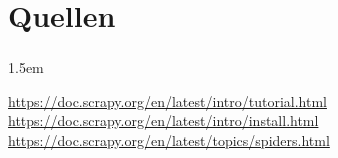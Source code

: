 \documentclass{beamer}
\begin{document}
\section{Quellen}
\begin{frame}
	\frametitle{\insertsection{}}
	\emergencystretch 1.5em
	{\small
	\begin{thebibliography}{8}
		\url{https://doc.scrapy.org/en/latest/intro/tutorial.html}
		\url{https://doc.scrapy.org/en/latest/intro/install.html}
		\url{https://doc.scrapy.org/en/latest/topics/spiders.html}
	\end{thebibliography}
	}
\end{frame}
\end{document}
